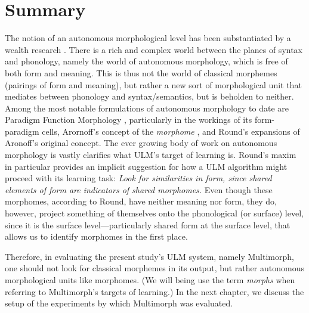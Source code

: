 \section{Summary}\label{sum}
The notion of an autonomous morphological level
has been substantiated by a wealth research \citep[including, e.g.,][]{stump:2001, aronoff:1994, round:2011, round:2015}.
There is a rich and complex 
world between the planes of syntax and phonology, namely the world of autonomous morphology, which is free of both form and meaning. This is thus not the world of classical morphemes (pairings of form and meaning), but rather a new sort of morphological unit that mediates between phonology and
syntax/semantics, but is beholden to neither.  
Among the most notable formulations of autonomous morphology to date are Paradigm Function Morphology \citep{stump:2001}, particularly in the workings of its form-paradigm cells, Arornoff's
concept of the \emph{morphome} \citep{aronoff:1994}, and Round's expansions \citep[e.g.,][]{round:2011,round:2015} of Aronoff's original concept. The ever growing body of work on autonomous morphology is vastly clarifies what \ac{ULM}'s target of learning is. Round's maxim in particular provides an implicit suggestion for how a \ac{ULM} algorithm might proceed with its learning task: \textit{Look for similarities in form, since shared elements of form are indicators of shared morphomes.} Even though these morphomes, according to Round, have neither meaning nor form, they do, however, project something of themselves onto the phonological (or surface) level, since it is the surface level---particularly shared  form at the surface level, that allows us to identify morphomes in the first place. 

Therefore, in evaluating the present study's ULM system, namely Multimorph, one should not look for classical morphemes in its output, but rather autonomous morphological units like morphomes. (We will being use the term \emph{morphs} when referring to Multimorph's targets of learning.)
In the next chapter, we discuss the setup of the experiments by which Multimorph was evaluated.